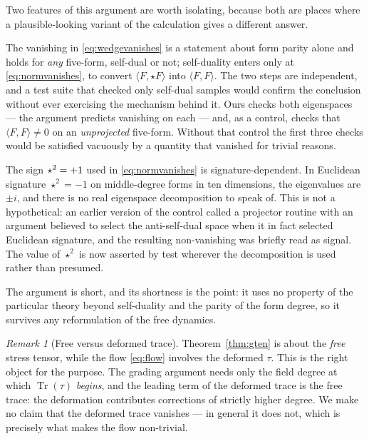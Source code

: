 \documentclass[11pt,a4paper]{article}
\theoremstyle{definition}
\theoremstyle{remark}
\newtheorem{remark}[theorem]{Remark}
\begin{document}
Two features of this argument are worth isolating, because both are places where
a plausible-looking variant of the calculation gives a different answer.

The vanishing in \eqref{eq:wedgevanishes} is a statement about form parity alone
and holds for \emph{any} five-form, self-dual or not; self-duality enters only at
\eqref{eq:normvanishes}, to convert $\langle F,\star F\rangle$ into
$\langle F,F\rangle$. The two steps are independent, and a test suite that
checked only self-dual samples would confirm the conclusion without ever
exercising the mechanism behind it. Ours checks both eigenspaces --- the argument
predicts vanishing on each --- and, as a control, checks that
$\langle F,F\rangle \neq 0$ on an \emph{unprojected} five-form. Without that
control the first three checks would be satisfied vacuously by a quantity that
vanished for trivial reasons.

The sign $\star^2 = +1$ used in \eqref{eq:normvanishes} is
signature-dependent. In Euclidean signature $\star^2 = -1$ on middle-degree forms
in ten dimensions, the eigenvalues are $\pm i$, and there is no real eigenspace
decomposition to speak of. This is not a hypothetical: an earlier version of the
control called a projector routine with an argument believed to select the
anti-self-dual space when it in fact selected Euclidean signature, and the
resulting non-vanishing was briefly read as signal. The value of $\star^2$ is now
asserted by test wherever the decomposition is used rather than presumed.

The argument is short, and its shortness is the point: it uses no property of the
particular theory beyond self-duality and the parity of the form degree, so it
survives any reformulation of the free dynamics.

\begin{remark}[Free versus deformed trace]
Theorem~\ref{thm:gten} is about the \emph{free} stress tensor, while the flow
\eqref{eq:flow} involves the deformed $\tau$. This is the right object for the
purpose. The grading argument needs only the field degree at which
$\operatorname{Tr}(\tau)$ \emph{begins}, and the leading term of the deformed
trace is the free trace: the deformation contributes corrections of strictly
higher degree. We make no claim that the deformed trace vanishes --- in general
it does not, which is precisely what makes the flow non-trivial.
\end{remark}
\end{document}
